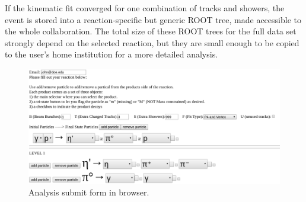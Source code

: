If the kinematic fit converged for one combination of tracks and showers, the event is stored into a reaction-specific but generic ROOT tree, made accessible to the whole collaboration. The total size of these ROOT trees for the full data set strongly depend on the selected reaction, but they are small enough to be copied to the user's home institution for a more detailed analysis.

\begin{figure}[h!]\centering
\includegraphics[width=\textwidth]{figures/analysis_submit_form.png}
\caption[]{\label{fig:production_analysis}Analysis submit form in browser.} 
\end{figure}